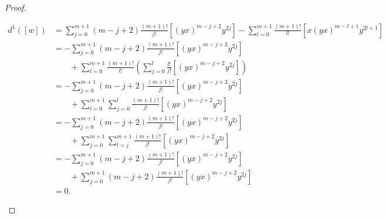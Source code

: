 \documentclass[fleqn,../tesis.tex]{subfiles}
\begin{document}
\begin{proof}
\begin{itemize}
			\begin{align*}
				d^1(\left[w\right]) &=
					\sum_{j = 0}^{m + 1}(m - j + 2)\frac{(m + 1)!}{j!}\left[(yx)^{m -j + 2}y^{2j}\right]
				-\sum_{l = 0}^{m + 1}\frac{(m + 1)!}{l!}\left[x(yx)^{m - l + 1}y^{2l + 1}\right] \\
				&=-\sum_{j = 0}^{m + 1}(m - j + 2)\frac{(m + 1)!}{j!}\left[(yx)^{m -j + 2}y^{2j}\right]\\
				& \qquad + \sum_{l = 0}^{m + 1}\frac{(m + 1)!}{l!}
					\left(\sum_{j = 0}^l\frac{l!}{j!}\left[(yx)^{m - j + 2}y^{2j}\right]\right) \\
				&= -	\sum_{j = 0}^{m + 1}(m - j + 2)\frac{(m + 1)!}{j!}\left[(yx)^{m -j + 2}y^{2j}\right]\\
				& \qquad + \sum_{l = 0}^{m + 1}\sum_{j = 0}^{l}\frac{(m + 1)!}{j!}
					\left[(yx)^{m - j + 2}y^{2j}\right]\\
				&= -	\sum_{j = 0}^{m + 1}(m - j + 2)\frac{(m + 1)!}{j!}\left[(yx)^{m -j + 2}y^{2j}\right]\\
				& \qquad + \sum_{j = 0}^{m + 1}\sum_{l = j}^{m + 1}\frac{(m + 1)!}{j!}
					\left[(yx)^{m - j + 2}y^{2j}\right]\\
				&= -	\sum_{j = 0}^{m + 1}(m - j + 2)\frac{(m + 1)!}{j!}\left[(yx)^{m -j + 2}y^{2j}\right]\\
				& \qquad + \sum_{j = 0}^{m + 1}(m - j + 2)\frac{(m + 1)!}{j!}
					\left[(yx)^{m - j + 2}y^{2j}\right]\\
				&= 0.
			\end{align*}	 
	\end{itemize}
\end{proof}
\end{document}
